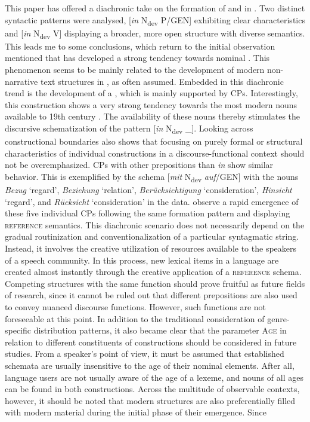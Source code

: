 \documentclass[output=paper,colorlinks,citecolor=brown]{langscibook}
\begin{document}
This paper has offered a diachronic take on the formation of  and  in . Two distinct syntactic patterns were analysed, [\textit{in} N\textsubscript{dev} P/GEN] exhibiting clear characteristics and [\textit{in} N\textsubscript{dev} V] displaying a broader, more open structure with diverse semantics. This leads me to some conclusions, which return to the initial observation mentioned that  has developed a strong tendency towards nominal . This phenomenon seems to be mainly related to the development of modern non-narrative text structures in , as often assumed. Embedded in this diachronic trend is the development of a , which is mainly supported by CPs. Interestingly, this construction shows a very strong tendency towards the most modern nouns available to 19th century . The availability of these nouns thereby stimulates the discursive schematization of the pattern [\textit{in} N\textsubscript{dev} \_]. Looking across constructional boundaries also shows that focusing on purely formal or structural characteristics of individual constructions in a discourse-functional context should not be overemphasized. CPs with other prepositions than \textit{in} show similar behavior. This is exemplified by the schema [\textit{mit} N\textsubscript{dev} \textit{auf}/GEN] with the nouns \textit{Bezug} ‘regard', \textit{Beziehung} ‘relation', \textit{Berücksichtigung} ‘consideration', \textit{Hinsicht} ‘regard', and \textit{Rücksicht} ‘consideration' in the data. \citet{Ruffthc} observe a rapid emergence of these five individual CPs following the same formation pattern and displaying \textsc{reference} semantics. This diachronic scenario does not necessarily depend on the gradual routinization and conventionalization of a particular syntagmatic string. Instead, it involves the creative utilization of resources available to the speakers of a speech community. In this process, new lexical items in a language are created almost instantly through the creative application of a \textsc{reference} schema. Competing structures with the same function should prove fruitful as future fields of research, since it cannot be ruled out that different prepositions are also used to convey nuanced discourse functions. However, such functions are not foreseeable at this point. In addition to the traditional consideration of genre-specific distribution patterns, it also became clear that the parameter \textsc{Age} in relation to different constituents of constructions should be considered in future studies. From a speaker's point of view, it must be assumed that established schemata are usually insensitive to the age of their nominal elements. After all, language users are not usually aware of the age of a lexeme, and nouns of all ages can be found in both constructions. Across the multitude of observable contexts, however, it should be noted that modern structures are also preferentially filled with modern material during the initial phase of their emergence. Since 
\end{document}
